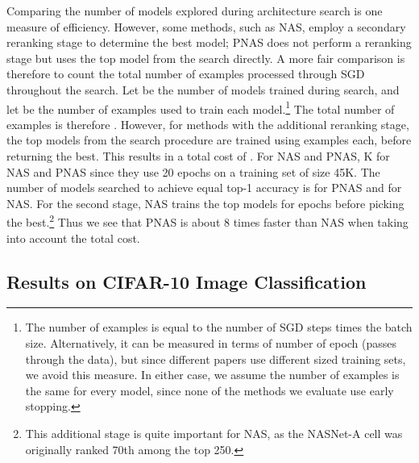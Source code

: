 \documentclass[runningheads]{llncs}
\begin{document}
Comparing the number of models explored during architecture search is one measure of efficiency.
However, some methods, such as NAS, employ a secondary reranking stage to determine the best model; PNAS does not perform a reranking stage but uses the top model from the search directly. 
A more fair comparison is therefore to count the total number of examples processed through SGD throughout the search.
Let  be the number of models trained during search,
and let  be the number of examples used to train each model.\footnote{The number of examples is equal to the number of SGD steps
times the batch size.
Alternatively, it can be measured in terms of number of epoch (passes through the data),
but since different papers use different sized training sets, we avoid this measure.
In either case, we assume the number of examples is the same for every model, since none of the methods
we evaluate use early stopping.
} The total number of examples is therefore .
However, for methods with the additional reranking stage,
the top  models from the search procedure are trained using  examples each, before returning the best.
This results in a total cost of 
.
For NAS and PNAS, 
 K for NAS and PNAS since they use 20 epochs on a training set of size 45K.
The number of models searched to achieve equal top-1 accuracy is
 for PNAS and  for NAS.
For the second stage, NAS trains the top  models for 
 epochs before picking the best.\footnote{This additional stage is quite important for NAS, as the NASNet-A cell was originally ranked 70th among the top 250.
}
Thus we see  that PNAS is about 8 times faster than NAS when taking into account the total cost.


\newcommand{\MPNAS}{1160} 
\newcommand{\MNAS}{20000} 
\newcommand{\MNAStwo}{250}
\newcommand{\MEA}{7000} 

\newcommand{\EPNAS}{} \newcommand{\ENAS}{} \newcommand{\ENAStwo}{} \newcommand{\EEA}{} 

\newcommand{\numPNAS}{}
\newcommand{\numNAS}{}
\newcommand{\numEA}{}




\newcommand{\ShlensEPNAS}{M} \newcommand{\ShlensENAS}{M} \newcommand{\ShlensENAStwo}{M} \newcommand{\ShlensEEA}{M} 


\newcommand{\ShlensnumPNAS}{B}
\newcommand{\ShlensnumNAS}{B}
\newcommand{\ShlensnumEA}{B}

 
\subsection{Results on CIFAR-10 Image Classification}
\label{sec:cifar}
\end{document}
